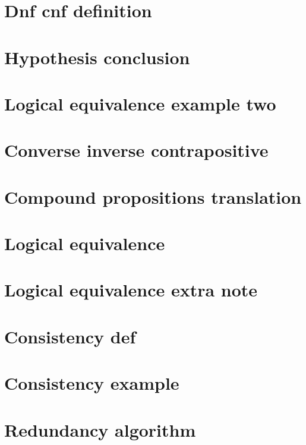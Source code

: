 \section*{Dnf cnf definition}

\vfill
\section*{Hypothesis conclusion}

\vfill
\section*{Logical equivalence example two}

\vfill
\section*{Converse inverse contrapositive}

\vfill
\section*{Compound propositions translation}

\vfill
\section*{Logical equivalence}

\vfill
\section*{Logical equivalence extra note}

\vfill
\section*{Consistency def}

\vfill
\section*{Consistency example}

\vfill
\section*{Redundancy algorithm}

\vfill
